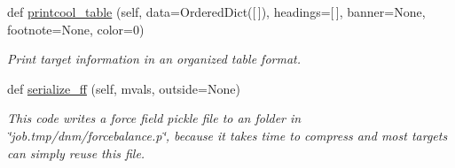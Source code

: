 \begin{DoxyCompactItemize}
def \hyperlink{classsrc_1_1target_1_1Target_aa6d59de5918c58d75a9f23eb1c5bff39}{printcool\+\_\+table} (self, data=Ordered\+Dict(\mbox{[}$\,$\mbox{]}), headings=\mbox{[}$\,$\mbox{]}, banner=None, footnote=None, color=0)
\begin{DoxyCompactList}\small\item\em Print target information in an organized table format. \end{DoxyCompactList}\item 
def \hyperlink{classsrc_1_1target_1_1Target_a8d05de21b2477b71aa74ea001f4d62b5}{serialize\+\_\+ff} (self, mvals, outside=None)
\begin{DoxyCompactList}\small\item\em This code writes a force field pickle file to an folder in \char`\"{}job.\+tmp/dnm/forcebalance.\+p\char`\"{}, because it takes time to compress and most targets can simply reuse this file. \end{DoxyCompactList}\end{DoxyCompactItemize}
